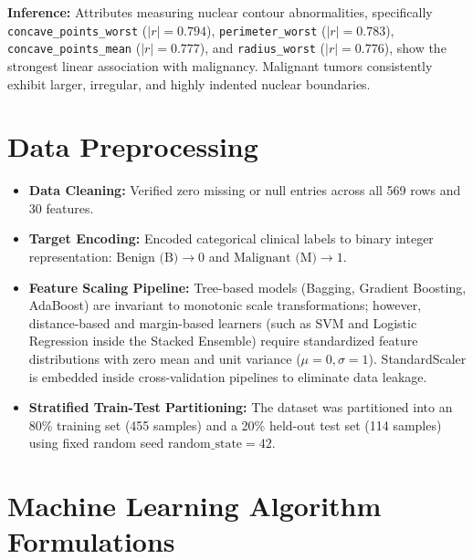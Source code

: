 \documentclass[12pt,a4paper]{article}
\begin{document}
\textbf{Inference:}
Attributes measuring nuclear contour abnormalities, specifically \texttt{concave\_points\_worst} ($|r| = 0.794$), \texttt{perimeter\_worst} ($|r| = 0.783$), \texttt{concave\_points\_mean} ($|r| = 0.777$), and \texttt{radius\_worst} ($|r| = 0.776$), show the strongest linear association with malignancy. Malignant tumors consistently exhibit larger, irregular, and highly indented nuclear boundaries.

\section{Data Preprocessing}
\begin{itemize}
\item \textbf{Data Cleaning:} Verified zero missing or null entries across all 569 rows and 30 features.
\item \textbf{Target Encoding:} Encoded categorical clinical labels to binary integer representation: $\text{Benign (B)} \rightarrow 0$ and $\text{Malignant (M)} \rightarrow 1$.
\item \textbf{Feature Scaling Pipeline:} Tree-based models (Bagging, Gradient Boosting, AdaBoost) are invariant to monotonic scale transformations; however, distance-based and margin-based learners (such as SVM and Logistic Regression inside the Stacked Ensemble) require standardized feature distributions with zero mean and unit variance ($\mu=0, \sigma=1$). StandardScaler is embedded inside cross-validation pipelines to eliminate data leakage.
\item \textbf{Stratified Train-Test Partitioning:} The dataset was partitioned into an 80\% training set (455 samples) and a 20\% held-out test set (114 samples) using fixed random seed $\text{random\_state}=42$.
\end{itemize}

\section{Machine Learning Algorithm Formulations}
\end{document}
